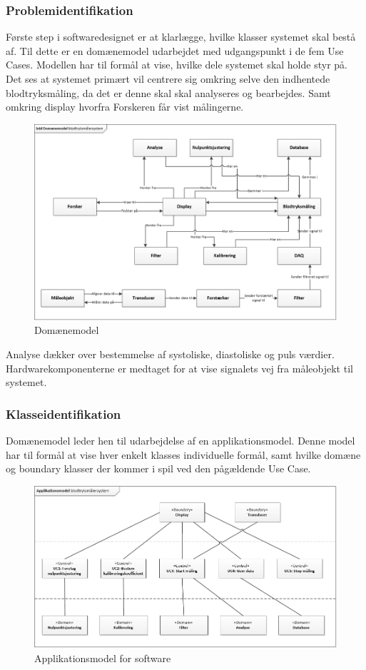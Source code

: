 \subsubsection{Problemidentifikation}
Første step i softwaredesignet er at klarlægge, hvilke klasser systemet skal bestå af. Til dette er en domænemodel udarbejdet med udgangspunkt i de fem Use Cases. Modellen har til formål at vise, hvilke dele systemet skal holde styr på. Det ses at systemet primært vil centrere sig omkring selve den indhentede blodtryksmåling, da det er denne skal skal analyseres og bearbejdes. Samt omkring display hvorfra Forskeren får vist målingerne.  
\begin{figure}[H]
	\centering
	\includegraphics[width=1.0\textwidth]{Figurer/DomaneModel}
	\caption{Domænemodel}
	\label{fig:Domaenemodel}
\end{figure}
Analyse dækker over bestemmelse af systoliske, diastoliske og puls værdier. Hardwarekomponenterne er medtaget for at vise signalets vej fra måleobjekt til systemet. 

\subsubsection{Klasseidentifikation}
Domænemodel leder hen til udarbejdelse af en applikationsmodel. Denne model har til formål at vise hver enkelt klasses individuelle formål, samt hvilke domæne og boundary klasser der kommer i spil ved den pågældende Use Case. 
\begin{figure}[H]
	\centering
	\includegraphics[width=1.0\textwidth]{Figurer/Applikationsmodel}
	\caption{Applikationsmodel for software}
	\label{fig:Applikationsmodellen}
\end{figure}
